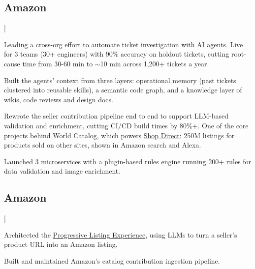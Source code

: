 \documentclass[]{deedy-resume-openfont}
\begin{document}
\subsection*{Amazon}
\medspace|\medspace
{}
\vspace{\topsep}
\begin{tightemize}
\item Leading a cross-org effort to automate ticket investigation with AI agents. Live for 3 teams (30+ engineers) with 90\% accuracy on holdout tickets, cutting root-cause time from 30-60 min to $\sim$10 min across 1,200+ tickets a year.
\item Built the agents' context from three layers: operational memory (past tickets clustered into reusable skills), a semantic code graph, and a knowledge layer of wikis, code reviews and design docs.
\item Rewrote the seller contribution pipeline end to end to support LLM-based validation and enrichment, cutting CI/CD build times by 80\%+. One of the core projects behind World Catalog, which powers \href{https://www.theinformation.com/articles/amazon-lists-250-million-products-rival-sites-effort-battle-agents}{Shop Direct}: 250M listings for products sold on other sites, shown in Amazon search and Alexa.
\item Launched 3 microservices with a plugin-based rules engine running 200+ rules for data validation and image enrichment.
\end{tightemize}
\sectionsep

\subsection*{Amazon}
\medspace|\medspace
{}
\vspace{\topsep}
\begin{tightemize}
\item Architected the \href{https://www.aboutamazon.com/news/innovation-at-amazon/amazon-generative-ai-powered-product-listings}{Progressive Listing Experience}, using LLMs to turn a seller's product URL into an Amazon listing.
\item Built and maintained Amazon's catalog contribution ingestion pipeline.
\end{tightemize}
\sectionsep
\end{document}
